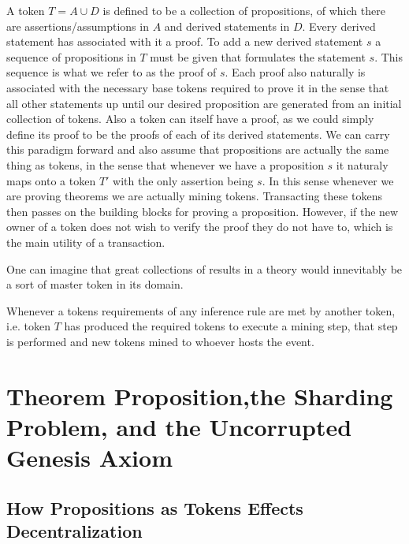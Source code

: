\documentclass[12pt]{amsart}
\begin{document}
A token $T = A\cup D$ is defined to be a collection of propositions, of which there are assertions/assumptions in $A$ and derived statements in $D$. Every derived statement has associated with it a proof. To add a new derived statement $s$ a sequence of propositions in $T$ must be given that formulates the statement $s$. This sequence is what we refer to as the proof of $s$. Each proof also naturally is associated with the necessary base tokens required to prove it in the sense that all other statements up until our desired proposition are generated from an initial collection of tokens. Also a token can itself have a proof, as we could simply define its proof to be the proofs of each of its derived statements. We can carry this paradigm forward and also assume that propositions are actually the same thing as tokens, in the sense that whenever we have a proposition $s$ it naturaly maps onto a token $T'$ with the only assertion being $s$. In this sense whenever we are proving theorems we are actually mining tokens. Transacting these tokens then passes on the building blocks for proving a proposition. However, if the new owner of a token does not wish to verify the proof they do not have to, which is the main utility of a transaction.

One can imagine that great collections of results in a theory would innevitably be a sort of master token in its domain.



Whenever a tokens requirements of any inference rule are met by another token, i.e. token $T$ has produced the required tokens to execute a mining step, that step is performed and new tokens mined to whoever hosts the event.



\section{Theorem Proposition,the Sharding Problem, and the Uncorrupted Genesis Axiom}

\subsection{How Propositions as Tokens Effects Decentralization}
\end{document}
